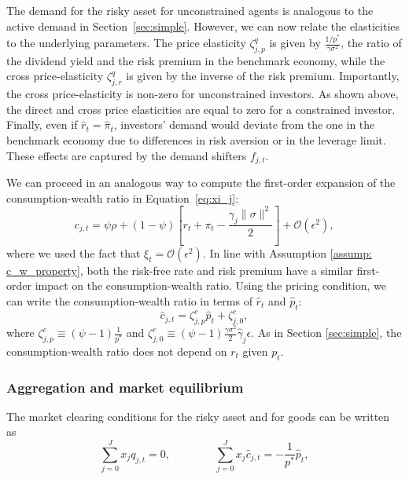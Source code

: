 The demand for the risky asset for unconstrained agents is analogous to the active demand in Section~\ref{sec:simple}. 
However, we can now relate the elasticities to the underlying parameters. 
The price elasticity $\zeta_{j,p}^q$ is given by $\frac{1/p^*}{\gamma \sigma^2}$, the ratio of the dividend yield and the risk premium in the benchmark economy, while the cross price-elasticity $\zeta_{j,r}^q$ is given by the inverse of the risk premium.  Importantly, the cross price-elasticity is non-zero for unconstrained investors. 
As shown above, the direct and cross price elasticities are equal to zero for a constrained investor. 
Finally, even if $\hat{r}_t = \hat{\pi}_t$, investors' demand would deviate from the one in the benchmark economy due to differences in risk aversion or in the leverage limit. 
These effects are captured by the demand shifters $f_{j,t}$.

We can proceed in an analogous way to compute the first-order expansion of the consumption-wealth ratio in Equation~\eqref{eq:xi_j}:
\begin{equation}
    c_{j,t} = \psi \rho + (1-\psi) \left[ r_t + \pi_t  - \frac{\gamma_j \|\sigma\|^2}{2}  \right] + \mathcal{O}(\epsilon^2),
\end{equation}
where we used the fact that $\xi_t = \mathcal{O}(\epsilon^2)$. 
In line with Assumption \ref{assump: c_w_property}, both the risk-free rate and risk premium have a similar first-order impact on the consumption-wealth ratio.
Using the pricing condition, we can write the consumption-wealth ratio in terms of $\hat{r}_t$ and $\hat{p}_t$:
\begin{equation}
    \hat{c}_{j,t} = \zeta^c_{j,p} \hat{p}_t + \zeta^c_{j,0},
\end{equation}
where $\zeta_{j,p}^c \equiv (\psi-1) \frac{1}{p^*}$ and $\zeta^c_{j,0} \equiv (\psi-1) \frac{\gamma \sigma^2}{2} \hat{\gamma}_j \epsilon$.
As in Section \ref{sec:simple}, the consumption-wealth ratio does not depend on $r_t$ given $p_t$. 

\subsubsection{Aggregation and market equilibrium}

The market clearing conditions for the risky asset and for goods can be written as
\begin{equation}
    \sum_{j=0}^J x_{j} q_{j,t} = 0, \qquad \qquad 
    \sum_{j=0}^J x_{j} \hat{c}_{j,t} = -\frac{1}{p^*} \hat{p}_t,
\end{equation}


